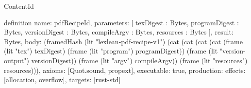 \begin{lexlean}{ContentId}
\begin{semanticmodule}
definition{
  name: pdfRecipeId,
  parameters: [
    texDigest : Bytes,
    programDigest : Bytes,
    versionDigest : Bytes,
    compileArgv : Bytes,
    resources : Bytes
  ],
  result: Bytes,
  body: (framedHash (lit "lexlean-pdf-recipe-v1") (cat (cat (cat (cat (frame (lit "tex") texDigest) (frame (lit "program") programDigest)) (frame (lit "version-output") versionDigest)) (frame (lit "argv") compileArgv)) (frame (lit "resources") resources))),
  axioms: [Quot.sound, propext],
  executable: true,
  production: {effects: [allocation, overflow], targets: [rust-std]}
}
\end{semanticmodule}
\end{lexlean}
